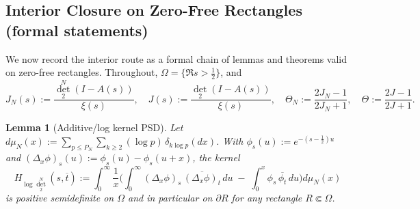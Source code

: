 \documentclass[11pt]{article}
\newtheorem{lemma}[theorem]{Lemma}
\theoremstyle{definition}
\theoremstyle{remark}
\begin{document}
\subsection*{Interior Closure on Zero-Free Rectangles (formal statements)}
We now record the interior route as a formal chain of lemmas and theorems valid on zero-free rectangles. Throughout, \(\Omega=\{\Re s>\tfrac12\}\), and
\[J_N(s):=\frac{\det_2^N(I-A(s))}{\xi(s)},\quad J(s):=\frac{\det_2(I-A(s))}{\xi(s)},\quad \Theta_N:=\frac{2J_N-1}{2J_N+1},\quad \Theta:=\frac{2J-1}{2J+1}.
\]

\begin{lemma}[Additive/log kernel PSD]\label{lem:log-psd-formal}
Let \(d\mu_N(x):=\sum_{p\le P_N}\sum_{k\ge2}(\log p)\,\delta_{k\log p}(dx)\). With \(\phi_s(u):=e^{-(s-\frac12)u}\) and \((\Delta_x\phi)_s(u):=\phi_s(u)-\phi_s(u+x)\), the kernel
\[H_{\log\det_2^N}(s,\overline t):=\int_0^\infty \frac{1}{x}\Big(\int_0^\infty (\Delta_x\phi)_s\,\overline{(\Delta_x\phi)_t}\,du\; -\; \int_0^x \phi_s\,\overline{\phi_t}\,du\Big)d\mu_N(x)
\]
is positive semidefinite on \(\Omega\) and in particular on \(\partial R\) for any rectangle \(R\Subset\Omega\).
\end{lemma}
\end{document}
